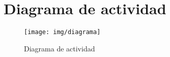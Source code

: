 \chapter{Diagrama de actividad}

\begin{figure}[!h]
  \centering
    \texttt{[image: img/diagrama]}
    \caption{Diagrama de actividad}
\end{figure}


